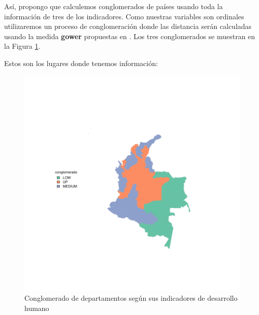 \documentclass{article}
\begin{document}
As\'i, propongo que calculemos conglomerados de pa\'ises usando toda la informaci\'on de tres de los indicadores. Como nuestras variables son ordinales utilizaremos un proceso de conglomeraci\'on donde las distancia ser\'an calculadas usando la medida {\bf gower} propuestas en \cite{macqueen_methods_nodate}. Los tres conglomerados se muestran en la Figura \ref{clustmap}.

Estos son los lugares donde tenemos informaci\'on:



\begin{figure}[h]
\centering
\begin{adjustbox}{width=10cm,height=8cm,clip,trim=1cm 1cm 1cm 1cm}
\includegraphics{Proyecto_final-plotMap}
\end{adjustbox}
\caption{Conglomerado de departamentos seg\'un sus indicadores de desarrollo humano}\label{clustmap}
\end{figure}
\clearpage

\renewcommand{\refname}{Bibliograf\'ia}

\end{document}
